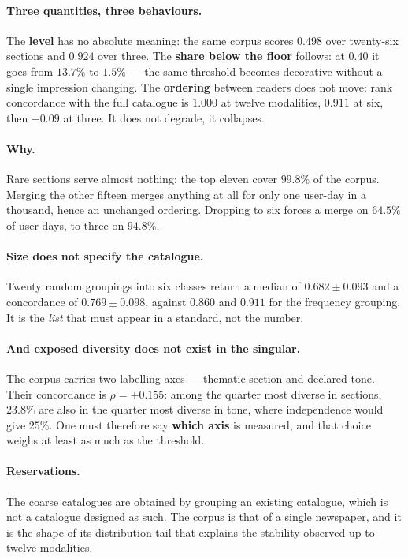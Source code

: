 \documentclass[11pt,a4paper]{article}
\begin{document}
\paragraph{Three quantities, three behaviours.} The \textbf{level} has no absolute meaning: the
same corpus scores $0.498$ over twenty-six sections and $0.924$ over three. The \textbf{share
below the floor} follows: at $0.40$ it goes from $13.7\%$ to $1.5\%$ --- the same threshold
becomes decorative without a single impression changing. The \textbf{ordering} between readers
does not move: rank concordance with the full catalogue is $1.000$ at twelve modalities, $0.911$
at six, then $-0.09$ at three. It does not degrade, it collapses.

\paragraph{Why.} Rare sections serve almost nothing: the top eleven cover $99.8\%$ of the corpus.
Merging the other fifteen merges anything at all for only one user-day in a thousand, hence an
unchanged ordering. Dropping to six forces a merge on $64.5\%$ of user-days, to three on $94.8\%$.

\paragraph{Size does not specify the catalogue.} Twenty random groupings into six classes return
a median of $0.682 \pm 0.093$ and a concordance of $0.769 \pm 0.098$, against $0.860$ and $0.911$
for the frequency grouping. It is the \emph{list} that must appear in a standard, not the number.

\paragraph{And exposed diversity does not exist in the singular.} The corpus carries two labelling
axes --- thematic section and declared tone. Their concordance is $\rho = +0.155$: among the
quarter most diverse in sections, $23.8\%$ are also in the quarter most diverse in tone, where
independence would give $25\%$. One must therefore say \textbf{which axis} is measured,
and that choice weighs at least as much as the threshold.

\paragraph{Reservations.} The coarse catalogues are obtained by grouping an existing catalogue,
which is not a catalogue designed as such. The corpus is that of a single newspaper, and it is the
shape of its distribution tail that explains the stability observed up to twelve modalities.
\end{document}
